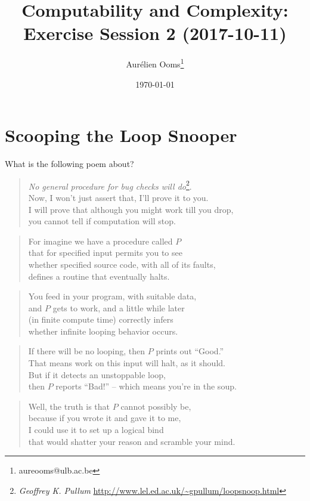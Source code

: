 \documentclass{article}
\title{Computability and Complexity:\\Exercise Session 2 (2017-10-11)}
\author{Aurélien Ooms\footnote{aureooms@ulb.ac.be}}
\date{\today}
\begin{document}
\maketitle
\tableofcontents

\section{Scooping the Loop Snooper}
What is the following poem about?

\begin{verse}
\emph{No general procedure for bug checks will do}\footnote{%
\emph{Geoffrey K. Pullum}
\url{http://www.lel.ed.ac.uk/~gpullum/loopsnoop.html}%
}.\\
Now, I won't just assert that, I’ll prove it to you.\\
I will prove that although you might work till you drop,\\
you cannot tell if computation will stop.
\end{verse}
\begin{verse}
For imagine we have a procedure called \(P\)\\
that for specified input permits you to see\\
whether specified source code, with all of its faults,\\
defines a routine that eventually halts.
\end{verse}
\begin{verse}
You feed in your program, with suitable data,\\
and \(P\) gets to work, and a little while later\\
(in finite compute time) correctly infers\\
whether infinite looping behavior occurs.
\end{verse}
\begin{verse}
If there will be no looping, then \(P\) prints out ``Good.''\\
That means work on this input will halt, as it should.\\
But if it detects an unstoppable loop,\\
then \(P\) reports ``Bad!'' -- which means you're in the soup.
\end{verse}
\begin{verse}
Well, the truth is that \(P\) cannot possibly be,\\
because if you wrote it and gave it to me,\\
I could use it to set up a logical bind\\
that would shatter your reason and scramble your mind.
\end{verse}
\end{document}
